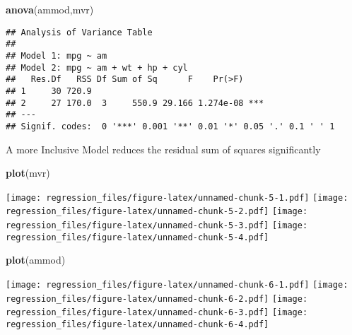\documentclass[]{article}
\newenvironment{Shaded}{\begin{snugshade}}{\end{snugshade}}
\newcommand{\KeywordTok}[1]{\textcolor[rgb]{0.13,0.29,0.53}{\textbf{{#1}}}}
\newcommand{\NormalTok}[1]{{#1}}
\begin{document}
\begin{Shaded}
\begin{Highlighting}[]
\KeywordTok{anova}\NormalTok{(ammod,mvr)}
\end{Highlighting}
\end{Shaded}

\begin{verbatim}
## Analysis of Variance Table
## 
## Model 1: mpg ~ am
## Model 2: mpg ~ am + wt + hp + cyl
##   Res.Df   RSS Df Sum of Sq      F    Pr(>F)    
## 1     30 720.9                                  
## 2     27 170.0  3     550.9 29.166 1.274e-08 ***
## ---
## Signif. codes:  0 '***' 0.001 '**' 0.01 '*' 0.05 '.' 0.1 ' ' 1
\end{verbatim}

A more Inclusive Model reduces the residual sum of squares significantly

\begin{Shaded}
\begin{Highlighting}[]
\KeywordTok{plot}\NormalTok{(mvr)}
\end{Highlighting}
\end{Shaded}

\texttt{[image: regression\_files/figure-latex/unnamed-chunk-5-1.pdf]}
\texttt{[image: regression\_files/figure-latex/unnamed-chunk-5-2.pdf]}
\texttt{[image: regression\_files/figure-latex/unnamed-chunk-5-3.pdf]}
\texttt{[image: regression\_files/figure-latex/unnamed-chunk-5-4.pdf]}

\begin{Shaded}
\begin{Highlighting}[]
\KeywordTok{plot}\NormalTok{(ammod)}
\end{Highlighting}
\end{Shaded}

\texttt{[image: regression\_files/figure-latex/unnamed-chunk-6-1.pdf]}
\texttt{[image: regression\_files/figure-latex/unnamed-chunk-6-2.pdf]}
\texttt{[image: regression\_files/figure-latex/unnamed-chunk-6-3.pdf]}
\texttt{[image: regression\_files/figure-latex/unnamed-chunk-6-4.pdf]}
\end{document}
